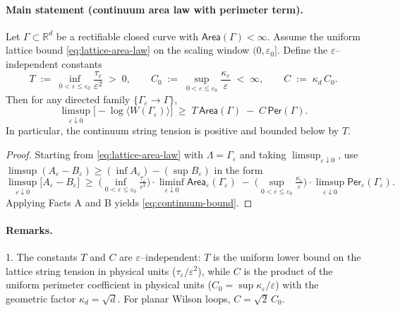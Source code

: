 \documentclass[11pt]{amsart}
\begin{document}
\paragraph{Main statement (continuum area law with perimeter term).}
\begin{theorem}
Let $\Gamma\subset\mathbb{R}^d$ be a rectifiable closed curve with $\mathsf{Area}(\Gamma)<\infty$. Assume the uniform lattice bound \eqref{eq:lattice-area-law} on the scaling window $(0,\varepsilon_0]$. Define the $\varepsilon$--independent constants
\[
  T\;:=\;\inf_{0<\varepsilon\le\varepsilon_0}\frac{\tau_\varepsilon}{\varepsilon^2}\;>\;0,\qquad
  C_0\;:=\;\sup_{0<\varepsilon\le\varepsilon_0}\frac{\kappa_\varepsilon}{\varepsilon}\;<\;\infty,\qquad
  C\;:=\;\kappa_d\,C_0.
\]
Then for any directed family $\{\Gamma_\varepsilon\to\Gamma\}$,
\begin{equation}
\label{eq:continuum-bound}
  \limsup_{\varepsilon\downarrow 0}\bigl[-\log\langle W(\Gamma_\varepsilon)\rangle\bigr]
  \;\ge\;
  T\,\mathsf{Area}(\Gamma)\;-
  \;C\,\mathsf{Per}(\Gamma).
\end{equation}
In particular, the continuum string tension is positive and bounded below by $T$.
\end{theorem}

\begin{proof}
Starting from \eqref{eq:lattice-area-law} with $\Lambda=\Gamma_\varepsilon$ and taking $\limsup_{\varepsilon\downarrow 0}$, use $\limsup(A_\varepsilon-B_\varepsilon)\ge (\inf A_\varepsilon)-(\sup B_\varepsilon)$ in the form
\[
  \limsup_{\varepsilon\downarrow 0}\bigl[A_\varepsilon-B_\varepsilon\bigr]
  \;\ge\;
  \Big(\inf_{0<\varepsilon\le\varepsilon_0}\tfrac{\tau_\varepsilon}{\varepsilon^2}\Big)\cdot
  \liminf_{\varepsilon\downarrow 0}\mathsf{Area}_\varepsilon(\Gamma_\varepsilon)
  \;-
  \;\Big(\sup_{0<\varepsilon\le\varepsilon_0}\tfrac{\kappa_\varepsilon}{\varepsilon}\Big)\cdot
  \limsup_{\varepsilon\downarrow 0}\mathsf{Per}_\varepsilon(\Gamma_\varepsilon).
\]
Applying Facts A and B yields \eqref{eq:continuum-bound}.
\end{proof}

\paragraph{Remarks.}
1. The constants $T$ and $C$ are $\varepsilon$--independent: $T$ is the uniform lower bound on the lattice string tension in physical units ($\tau_\varepsilon/\varepsilon^2$), while $C$ is the product of the uniform perimeter coefficient in physical units ($C_0=\sup\kappa_\varepsilon/\varepsilon$) with the geometric factor $\kappa_d=\sqrt{d}$. For planar Wilson loops, $C=\sqrt{2}\,C_0$.
\end{document}
